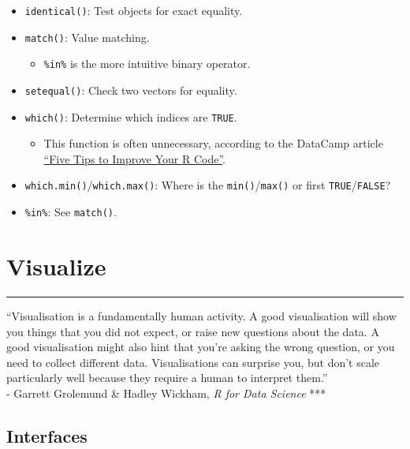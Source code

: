 \documentclass[
]{book}
\providecommand{\tightlist}{%
  \setlength{\itemsep}{0pt}\setlength{\parskip}{0pt}}
\begin{document}
\begin{itemize}
\tightlist
\item
  \texttt{identical()}: Test objects for exact equality.
\item
  \texttt{match()}: Value matching.

  \begin{itemize}
  \tightlist
  \item
    \texttt{\%in\%} is the more intuitive binary operator.
  \end{itemize}
\item
  \texttt{setequal()}: Check two vectors for equality.
\item
  \texttt{which()}: Determine which indices are \texttt{TRUE}.

  \begin{itemize}
  \tightlist
  \item
    This function is often unnecessary, according to the DataCamp article \href{https://www.datacamp.com/community/tutorials/five-tips-r-code-improve}{``Five Tips to Improve Your R Code''}.
  \end{itemize}
\item
  \texttt{which.min()}/\texttt{which.max()}: Where is the \texttt{min()}/\texttt{max()} or first \texttt{TRUE}/\texttt{FALSE}?
\item
  \texttt{\%in\%}: See \texttt{match()}.
\end{itemize}

\hypertarget{visualize}{%
\chapter{Visualize}\label{visualize}}

\begin{center}\rule{0.5\linewidth}{0.5pt}\end{center}

``Visualisation is a fundamentally human activity. A good visualisation will show you things that you did not expect, or raise new questions about the data. A good visualisation might also hint that you're asking the wrong question, or you need to collect different data. Visualisations can surprise you, but don't scale particularly well because they require a human to interpret them.''\\
- Garrett Grolemund \& Hadley Wickham, \emph{R for Data Science}
***

\hypertarget{interfaces}{%
\section{Interfaces}\label{interfaces}}
\end{document}
